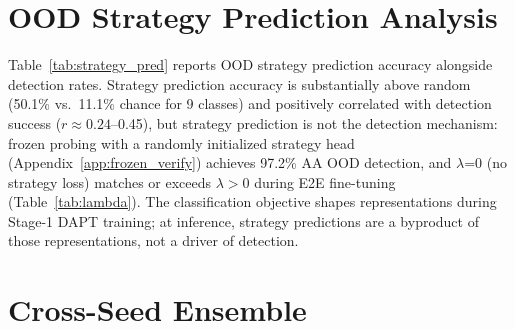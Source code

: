\section{OOD Strategy Prediction Analysis}
\label{app:strategy_pred}

\begin{table}[ht]
\centering
\footnotesize
\caption{OOD strategy prediction accuracy (jailbreak turns only) and detection rate for the 9-class model (3-seed mean). $r$: Pearson correlation between per-strategy prediction accuracy and per-strategy detection rate.}
\label{tab:strategy_pred}
\end{table}

Table~\ref{tab:strategy_pred} reports OOD strategy prediction accuracy alongside detection rates. Strategy prediction accuracy is substantially above random (50.1\% vs.\ 11.1\% chance for 9 classes) and positively correlated with detection success ($r \approx 0.24$--0.45), but strategy prediction is not the detection mechanism: frozen probing with a randomly initialized strategy head (Appendix~\ref{app:frozen_verify}) achieves 97.2\% AA OOD detection, and $\lambda$=0 (no strategy loss) matches or exceeds $\lambda > 0$ during E2E fine-tuning (Table~\ref{tab:lambda}). The classification objective shapes representations during Stage-1 DAPT training; at inference, strategy predictions are a byproduct of those representations, not a driver of detection.

\section{Cross-Seed Ensemble}
\label{app:ensemble}

\begin{table}[ht]
\centering
\footnotesize
\caption{Majority vote ensemble (3 seeds) vs.\ single-seed mean on OOD Full. ``Fixed'' = samples corrected by ensemble; ``Broke'' = samples corrupted by ensemble.}
\label{tab:ensemble}
\end{table}


